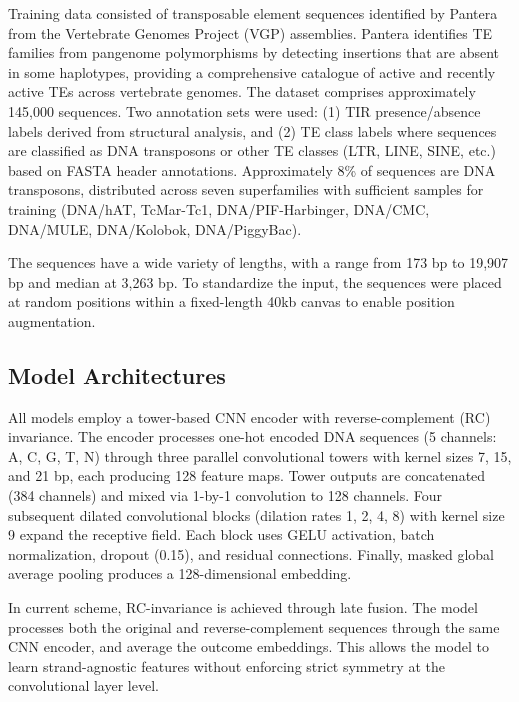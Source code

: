 \documentclass[12pt]{article}
\begin{document}
Training data consisted of transposable element sequences identified by Pantera \cite{sierra2024pantera} from the Vertebrate Genomes Project (VGP) assemblies. Pantera identifies TE families from pangenome polymorphisms by detecting insertions that are absent in some haplotypes, providing a comprehensive catalogue of active and recently active TEs across vertebrate genomes. The dataset comprises approximately 145,000 sequences. Two annotation sets were used: (1) TIR presence/absence labels derived from structural analysis, and (2) TE class labels where sequences are classified as DNA transposons or other TE classes (LTR, LINE, SINE, etc.) based on FASTA header annotations. Approximately 8\% of sequences are DNA transposons, distributed across seven superfamilies with sufficient samples for training (DNA/hAT, TcMar-Tc1, DNA/PIF-Harbinger, DNA/CMC, DNA/MULE, DNA/Kolobok, DNA/PiggyBac).

The sequences have a wide variety of lengths, with a range from 173 bp to 19,907 bp and median at 3,263 bp. To standardize the input, the sequences were placed at random positions within a fixed-length 40kb canvas to enable position augmentation.

\subsection{Model Architectures}

All models employ a tower-based CNN encoder with reverse-complement (RC) invariance. The encoder processes one-hot encoded DNA sequences (5 channels: A, C, G, T, N) through three parallel convolutional towers with kernel sizes 7, 15, and 21 bp, each producing 128 feature maps. Tower outputs are concatenated (384 channels) and mixed via 1-by-1 convolution to 128 channels. Four subsequent dilated convolutional blocks (dilation rates 1, 2, 4, 8) with kernel size 9 expand the receptive field. Each block uses GELU activation, batch normalization, dropout (0.15), and residual connections. Finally, masked global average pooling produces a 128-dimensional embedding.

In current scheme, RC-invariance is achieved through late fusion. The model processes both the original and reverse-complement sequences through the same CNN encoder, and average the outcome embeddings. This allows the model to learn strand-agnostic features without enforcing strict symmetry at the convolutional layer level. 
\end{document}
